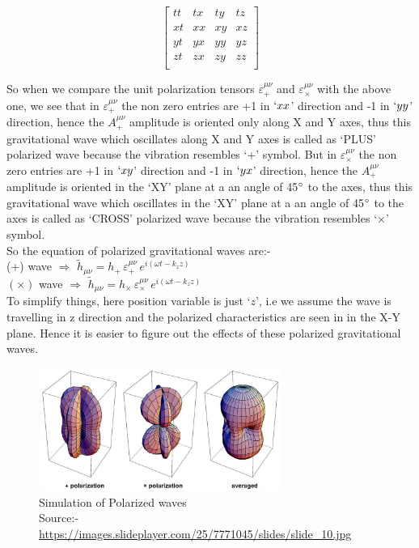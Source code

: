 \begin{equation*}
    \begin{bmatrix}
    tt & tx & ty & tz \\
    xt & xx & xy & xz \\
    yt & yx & yy & yz \\
    zt & zx & zy & zz \\
    \end{bmatrix}
\end{equation*}

\noindent So when we compare the unit polarization tensors $\varepsilon^{\mu\nu}_{+}$ and $\varepsilon^{\mu\nu}_{\times}$ with the above one, we see that in $\varepsilon^{\mu\nu}_{+}$ the non zero entries are +1 in $`xx$' direction and -1 in $`yy$' direction, hence the $A^{\mu\nu}_{+}$ amplitude is oriented only along X and Y axes, thus this gravitational wave which oscillates along X and Y axes is called as `PLUS' polarized wave because the vibration resembles `+' symbol. But in $\varepsilon^{\mu\nu}_{\times}$ the non zero entries are +1 in $`xy$' direction and -1 in $`yx$' direction, hence the $A^{\mu\nu}_{+}$ amplitude is oriented in the `XY' plane at a an angle of 45$\degree$ to the axes, thus this gravitational wave which oscillates in the `XY' plane at a an angle of 45$\degree$ to the axes is called as `CROSS' polarized wave because the vibration resembles `$\times$' symbol. 
\\

\noindent So the equation of polarized gravitational waves are:-\\
(+) wave $\Rightarrow $  $\tilde{h}_{\mu\nu} = h_{+}\, \varepsilon^{\mu\nu}_{+}\, e^{i(\omega t - k_{z}z)}$\\
$(\times)$ wave $\Rightarrow $  $\tilde{h}_{\mu\nu} = h_{\times}\, \varepsilon^{\mu\nu}_{\times}\, e^{i(\omega t - k_{z}z)}$
\\
\noindent To simplify things, here position variable is just `$z$', i.e we assume the wave is travelling in z direction and the polarized characteristics are seen in in the X-Y plane. Hence it is easier to figure out the effects of these polarized gravitational waves.

\begin{figure}[h]
    \centering
    \includegraphics[height=4cm, width = 8cm]{images.tex/polarization_simulation.jpeg}
    \caption{Simulation of Polarized waves\\ Source:- \url{https://images.slideplayer.com/25/7771045/slides/slide_10.jpg}}
\end{figure}

\pagebreak
